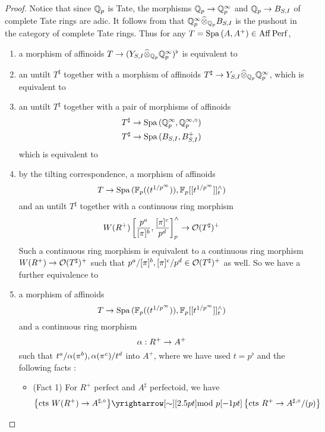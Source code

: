 \documentclass{article}
\begin{document}
\begin{proof}
  Notice that since $\mathbb{Q}_p$ is Tate,
  the morphisms $\mathbb{Q}_p \to \mathbb{Q}_p^\infty$ and 
  $\mathbb{Q}_p \to B_{S , I}$ of complete Tate rings are adic.
  It follows from \cite[Prop. 5.1.5.(2), Rmk. 5.1.6]{SW20}
  that $\mathbb{Q}_p^\infty \widehat{\otimes}_{\mathbb{Q}_p} B_{S , I}$
  is the pushout in the category of complete Tate rings.
  Thus for any $T = \mathrm{Spa}\,(A , A^+) \in \mathrm{Aff}\operatorname{Perf}$, 
  \begin{enumerate}
    \item a morphism of affinoids 
    $T \to (Y_{S , I} \widehat{\otimes}_{\mathbb{Q}_p} \mathbb{Q}_p^\infty)^\flat $
    is equivalent to
    \item an untilt $T^\sharp$ together with a morphism of affinoids
    $T^\sharp \to Y_{S , I} \widehat{\otimes}_{\mathbb{Q}_p} \mathbb{Q}_p^\infty$,
    which is equivalent to
    \item an untilt $T^\sharp$ together with a pair of morphisms
    of affinoids 
    \begin{align*}
      T^\sharp \to \mathrm{Spa}\, (\mathbb{Q}_p^\infty , \mathbb{Q}_p^{\infty , \circ}) \\
      T^\sharp \to \mathrm{Spa}\, (B_{S , I} , B_{S , I}^+)
    \end{align*}
    which is equivalent to
    \item by the tilting correspondence,
    a morphism of affinoids 
    \[
      T \to \mathrm{Spa}\, (\mathbb{F}_p((t^{1 / p^\infty})) , \mathbb{F}_p[[t^{1 / p^\infty}]]^\wedge_t)
    \]
    and an untilt $T^\sharp$ together with a continuous ring morphism 
    \[
      W(R^+)\left[\frac{p^a}{[\pi]^b} , \frac{[\pi]^c}{p^d}\right]^\wedge_p
      \to \mathcal{O}(T^\sharp)^+
    \]
    Such a continuous ring morphism
    is equivalent to a continuous ring morphism 
    $W(R^+) \to \mathcal{O}(T^\sharp)^+$ such that
    $p^a / [\pi]^b , [\pi]^c / p^d \in \mathcal{O}(T^\sharp)^+$ as well.
    So we have a further equivalence to 
    \item a morphism of affinoids 
    \[
      T \to \mathrm{Spa}\, (\mathbb{F}_p((t^{1 / p^\infty})) , \mathbb{F}_p[[t^{1 / p^\infty}]]^\wedge_t)
    \]
    and a continuous ring morphism
    \[
      \alpha : R^+ \to A^+
    \]
    such that $t^a / \alpha(\pi^b) , \alpha(\pi^c) / t^d$ into $A^+$,
    where we have used $t = p^\flat$
    and the following facts : 
    \begin{itemize}
      \item (Fact 1) For $R^+$ perfect and $A^\sharp$ perfectoid,
      we have \begin{align*}
        \set{\text{cts $W(R^+) \to A^{\sharp , \circ}$}}
        &\map{\text{mod $p$}}{\sim}
        \set{\text{cts $R^+ \to A^{\sharp , \circ} / (p)$}} 

\end{align*}
\end{itemize}
\end{enumerate}
\end{proof}
\end{document}
